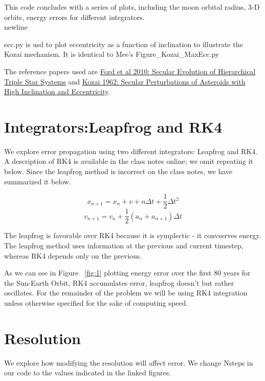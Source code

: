 \documentclass[11pt,letterpaper]{article}
\begin{document}
This code concludes with a series of plots, including the moon orbital radius, 3-D orbits, energy errors for different integrators.\\newline

ecc.py is usd to plot eccentricity as a function of inclination to illustrate the Kozai mechanism. It is identical to Mee's Figure\_Kozai\_MaxEcc.py

The reference papers used are \href{http://iopscience.iop.org/0004-637X/535/1/385/pdf/40691.web.pdf}{Ford et al 2010: Secular Evolution of Hierarchical Triple Star Systems} and \href{http://adsabs.harvard.edu/cgi-bin/bib_query?1962AJ.....67..591K}{Kozai 1962: Secular Perturbations of Asteroids with High Inclination and Eccentricity}.

\section{Integrators:Leapfrog and RK4}

We explore error propagation using two different integrators: Leapfrog and RK4.
A description of RK4 is available in the class notes online; we omit repeating it below. Since the leapfrog method is incorrect on the class notes, we have summarized it below.

\begin{equation}
x_{n+1}=x_n+v+n\Delta t+\frac{1}{2} \Delta t^2
\end{equation}
\begin{equation}
v_{n+1}=v_n+\frac{1}{2}(a_n+a_{n+1})\Delta t
\end{equation}

The leapfrog is favorable over RK4 because it is symplectic - it convserves energy. The leapfrog method uses information at the previous and current timestep, whereas RK4 depends only on the previous.

As we can see in Figure ~\ref{fig:1} plotting energy error over the first 80 years for the Sun-Earth Orbit, RK4 accumulates error, leapfrog doesn't but rather oscillates. For the remainder of the problem we will be using RK4 integration unless otherwise specified for the sake of computing speed. 

\section{Resolution}
We explore how modifying the resolution will affect error. We change Nsteps in our code to the values indicated in the linked figures.
\end{document}
